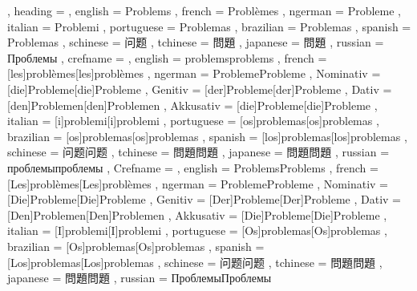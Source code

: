  {
    , heading =   {
                    , english     = Problems
                    , french      = Problèmes
                    , ngerman     = Probleme
                    , italian     = Problemi
                    , portuguese  = Problemas
                    , brazilian   = Problemas
                    , spanish     = Problemas
                    , schinese    = 问题
                    , tchinese    = 問題
                    , japanese    = 問題
                    , russian     = Проблемы
                  }
    , crefname =  {
                    , english     = {problems}{problems}
                    , french      = [les]{problèmes}[les]{problèmes}
                    , ngerman     = { {Probleme}{Probleme}
                                      , Nominativ = [die]{Probleme}[die]{Probleme}
                                      , Genitiv   = [der]{Probleme}[der]{Probleme}
                                      , Dativ     = [den]{Problemen}[den]{Problemen}
                                      , Akkusativ = [die]{Probleme}[die]{Probleme}
                                    }
                    , italian     = [i]{problemi}[i]{problemi}
                    , portuguese  = [os]{problemas}[os]{problemas}
                    , brazilian   = [os]{problemas}[os]{problemas}
                    , spanish     = [los]{problemas}[los]{problemas}
                    , schinese    = {问题}{问题}
                    , tchinese    = {問題}{問題}
                    , japanese    = {問題}{問題}
                    , russian     = {проблемы}{проблемы}
                  }
    , Crefname =  {
                    , english     = {Problems}{Problems}
                    , french      = [Les]{problèmes}[Les]{problèmes}
                    , ngerman     = { {Probleme}{Probleme}
                                      , Nominativ = [Die]{Probleme}[Die]{Probleme}
                                      , Genitiv   = [Der]{Probleme}[Der]{Probleme}
                                      , Dativ     = [Den]{Problemen}[Den]{Problemen}
                                      , Akkusativ = [Die]{Probleme}[Die]{Probleme}
                                    }
                    , italian     = [I]{problemi}[I]{problemi}
                    , portuguese  = [Os]{problemas}[Os]{problemas}
                    , brazilian   = [Os]{problemas}[Os]{problemas}
                    , spanish     = [Los]{problemas}[Los]{problemas}
                    , schinese    = {问题}{问题}
                    , tchinese    = {問題}{問題}
                    , japanese    = {問題}{問題}
                    , russian     = {Проблемы}{Проблемы}
                  }
  }

